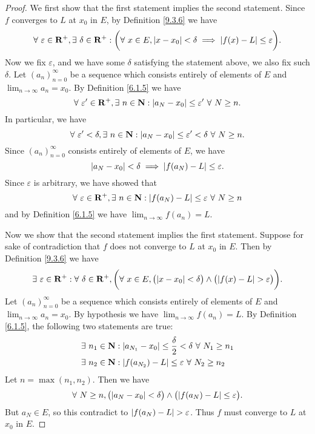 \begin{proof}
    We first show that the first statement implies the second statement.
    Since \(f\) converges to \(L\) at \(x_0\) in \(E\), by Definition \ref{9.3.6} we have
    \[
        \forall\ \varepsilon \in \mathbf{R}^+, \exists\ \delta \in \mathbf{R}^+ : \bigg(\forall\ x \in E, \abs*{x - x_0} < \delta \implies \abs*{f(x) - L} \leq \varepsilon\bigg).
    \]
    Now we fix \(\varepsilon\), and we have some \(\delta\) satisfying the statement above, we also fix such \(\delta\).
    Let \((a_n)_{n = 0}^\infty\) be a sequence which consists entirely of elements of \(E\) and \(\lim_{n \to \infty} a_n = x_0\).
    By Definition \ref{6.1.5} we have
    \[
        \forall\ \varepsilon' \in \mathbf{R}^+, \exists\ n \in \mathbf{N} : \abs*{a_N - x_0} \leq \varepsilon' \ \forall\ N \geq n.
    \]
    In particular, we have
    \[
        \forall\ \varepsilon' < \delta, \exists\ n \in \mathbf{N} : \abs*{a_N - x_0} \leq \varepsilon' < \delta \ \forall\ N \geq n.
    \]
    Since \((a_n)_{n = 0}^\infty\) consists entirely of elements of \(E\), we have
    \[
        \abs*{a_N - x_0} < \delta \implies \abs*{f(a_N) - L} \leq \varepsilon.
    \]
    Since \(\varepsilon\) is arbitrary, we have showed that
    \[
        \forall\ \varepsilon \in \mathbf{R}^+, \exists\ n \in \mathbf{N} : \abs*{f(a_N) - L} \leq \varepsilon \ \forall\ N \geq n
    \]
    and by Definition \ref{6.1.5} we have \(\lim_{n \to \infty} f(a_n) = L\).

    Now we show that the second statement implies the first statement.
    Suppose for sake of contradiction that \(f\) does not converge to \(L\) at \(x_0\) in \(E\).
    Then by Definition \ref{9.3.6} we have
    \[
        \exists\ \varepsilon \in \mathbf{R}^+ : \forall\ \delta \in \mathbf{R}^+, \bigg(\forall\ x \in E, \big(\abs*{x - x_0} < \delta\big) \land \big(\abs*{f(x) - L} > \varepsilon\big)\bigg).
    \]
    Let \((a_n)_{n = 0}^\infty\) be a sequence which consists entirely of elements of \(E\) and \(\lim_{n \to \infty} a_n = x_0\).
    By hypothesis we have \(\lim_{n \to \infty} f(a_n) = L\).
    By Definition \ref{6.1.5}, the following two statements are true:
    \begin{align*}
         & \exists\ n_1 \in \mathbf{N} : \abs*{a_{N_1} - x_0} \leq \frac{\delta}{2} < \delta \ \forall\ N_1 \geq n_1 \\
         & \exists\ n_2 \in \mathbf{N} : \abs*{f(a_{N_2}) - L} \leq \varepsilon \ \forall\ N_2 \geq n_2
    \end{align*}
    Let \(n = \max(n_1, n_2)\).
    Then we have
    \[
        \forall\ N \geq n, \big(\abs*{a_N - x_0} < \delta\big) \land \big(\abs*{f(a_N) - L} \leq \varepsilon\big).
    \]
    But \(a_N \in E\), so this contradict to \(\abs*{f(a_N) - L} > \varepsilon\).
    Thus \(f\) must converge to \(L\) at \(x_0\) in \(E\).
\end{proof}

